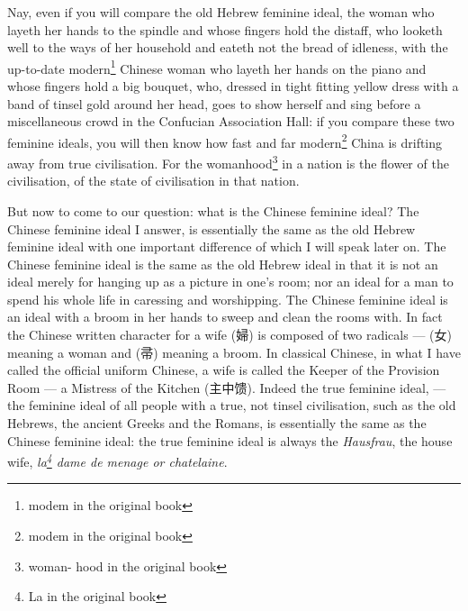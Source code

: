 Nay, even if you will compare the old Hebrew feminine ideal, the woman who layeth her hands to the spindle and whose fingers hold the distaff, who looketh well to the ways of her household and eateth not the bread of idleness, with the up-to-date modern\footnote{modem in the original book} Chinese woman who layeth her hands on the piano and whose fingers hold a big bouquet, who, dressed in tight fitting yellow dress with a band of tinsel gold around her head, goes to show herself and sing before a miscellaneous crowd in the Confucian Association Hall: if you compare these two feminine ideals, you will then know how fast and far modern\footnote{modem in the original book} China is drifting away from true civilisation.
For the womanhood\footnote{woman- hood in the original book} in a nation is the flower of the civilisation, of the state of civilisation in that nation.

But now to come to our question: what is the Chinese feminine ideal? 
The Chinese feminine ideal I answer, is essentially the same as the old Hebrew feminine ideal with one important difference of which I will speak later on.
The Chinese feminine ideal is the same as the old Hebrew ideal in that it is not an ideal merely for hanging up as a picture in one's room; nor an ideal for a man to spend his whole life in caressing and worshipping.
The Chinese feminine ideal is an ideal with a broom in her hands to sweep and clean the rooms with.
In fact the Chinese written character for a wife (婦) is composed of two radicals --- (女) meaning a woman and (帚) meaning a broom.
In classical Chinese, in what I have called the official uniform Chinese, a wife is called the Keeper of the Provision Room --- a Mistress of the Kitchen (主中馈). 
Indeed the true feminine ideal, --- the feminine ideal of all people with a true, not tinsel civilisation, such as the old Hebrews, the ancient Greeks and the Romans, is essentially the same as the Chinese feminine ideal: the true feminine ideal is always the \emph{Hausfrau}, the house wife, \emph{la\footnote{La in the original book} dame de menage  or chatelaine}.

